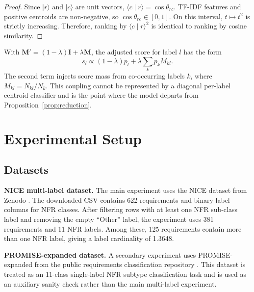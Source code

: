 \documentclass[runningheads]{llncs}
\begin{document}
\begin{proof}
Since $\lvert r\rangle$ and $\lvert c\rangle$ are unit vectors,
$\langle c\mid r\rangle=\cos\theta_{rc}$. TF-IDF features and positive
centroids are non-negative, so $\cos\theta_{rc}\in[0,1]$. On this interval,
$t\mapsto t^2$ is strictly increasing. Therefore, ranking by
$\langle c\mid r\rangle^2$ is identical to ranking by cosine similarity.
\end{proof}

\begin{proposition}
\label{prop:interference}
With $\mathbf{M}'=(1-\lambda)\mathbf{I}+\lambda\mathbf{M}$, the adjusted score
for label $l$ has the form
\begin{equation}
    s_l \propto (1-\lambda)p_l + \lambda\sum_k p_k M_{kl}.
\end{equation}
The second term injects score mass from co-occurring labels $k$, where
$M_{kl}=N_{kl}/N_k$. This coupling cannot be represented by a diagonal
per-label centroid classifier and is the point where the model departs from
Proposition~\ref{prop:reduction}.
\end{proposition}

\section{Experimental Setup}
\subsection{Datasets}
\textbf{NICE multi-label dataset.} The main experiment uses the NICE dataset
from Zenodo \cite{nice_dataset}. The downloaded CSV contains 622 requirements
and binary label columns for NFR classes. After filtering rows with at least one
NFR sub-class label and removing the empty ``Other'' label, the experiment uses
381 requirements and 11 NFR labels. Among these, 125 requirements contain more
than one NFR label, giving a label cardinality of 1.3648.

\textbf{PROMISE-expanded dataset.} A secondary experiment uses
PROMISE-expanded from the public requirements classification repository
\cite{mitrevski_promise_exp}. This dataset is treated as an 11-class
single-label NFR subtype classification task and is used as an auxiliary sanity
check rather than the main multi-label experiment.
\end{document}
